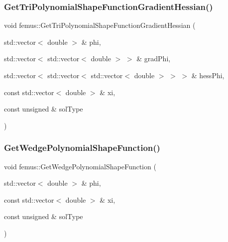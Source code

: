 \subsubsection{\texorpdfstring{Get\+Tri\+Polynomial\+Shape\+Function\+Gradient\+Hessian()}{GetTriPolynomialShapeFunctionGradientHessian()}}
{\footnotesize\ttfamily void femus\+::\+Get\+Tri\+Polynomial\+Shape\+Function\+Gradient\+Hessian (\begin{DoxyParamCaption}\item[{std\+::vector$<$ double $>$ \&}]{phi,  }\item[{std\+::vector$<$ std\+::vector$<$ double $>$ $>$ \&}]{grad\+Phi,  }\item[{std\+::vector$<$ std\+::vector$<$ std\+::vector$<$ double $>$ $>$ $>$ \&}]{hess\+Phi,  }\item[{const std\+::vector$<$ double $>$ \&}]{xi,  }\item[{const unsigned \&}]{sol\+Type }\end{DoxyParamCaption})}

\mbox{\label{namespacefemus_a524cf02fcd06e7ce0eedece31381e256}} 
\subsubsection{\texorpdfstring{Get\+Wedge\+Polynomial\+Shape\+Function()}{GetWedgePolynomialShapeFunction()}}
{\footnotesize\ttfamily void femus\+::\+Get\+Wedge\+Polynomial\+Shape\+Function (\begin{DoxyParamCaption}\item[{std\+::vector$<$ double $>$ \&}]{phi,  }\item[{const std\+::vector$<$ double $>$ \&}]{xi,  }\item[{const unsigned \&}]{sol\+Type }\end{DoxyParamCaption})}

\mbox{\label{namespacefemus_a9353c0e0a9cf18b653c60a3dd9b5c08a}} 
